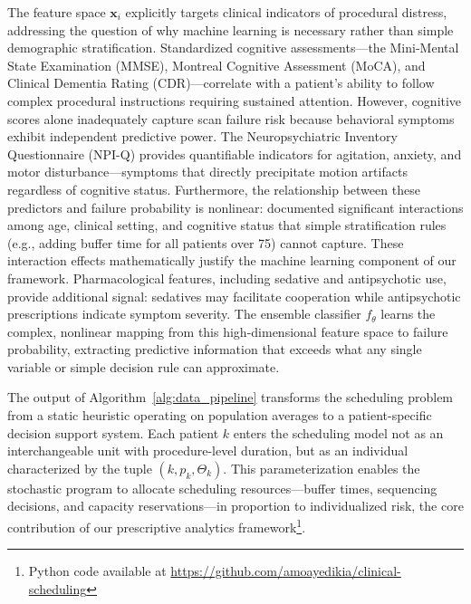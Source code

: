 \documentclass[11pt,a4paper]{article}
\begin{document}
The feature space $\mathbf{x}_i$ explicitly targets clinical indicators of procedural distress, addressing the question of why machine learning is necessary rather than simple demographic stratification. Standardized cognitive assessments---the Mini-Mental State Examination (MMSE), Montreal Cognitive Assessment (MoCA), and Clinical Dementia Rating (CDR)---correlate with a patient's ability to follow complex procedural instructions requiring sustained attention. However, cognitive scores alone inadequately capture scan failure risk because behavioral symptoms exhibit independent predictive power. The Neuropsychiatric Inventory Questionnaire (NPI-Q) provides quantifiable indicators for agitation, anxiety, and motor disturbance---symptoms that directly precipitate motion artifacts regardless of cognitive status. Furthermore, the relationship between these predictors and failure probability is nonlinear: \citet{porembka2025disparities} documented significant interactions among age, clinical setting, and cognitive status that simple stratification rules (e.g., adding buffer time for all patients over 75) cannot capture. These interaction effects mathematically justify the machine learning component of our framework. Pharmacological features, including sedative and antipsychotic use, provide additional signal: sedatives may facilitate cooperation while antipsychotic prescriptions indicate symptom severity. The ensemble classifier $f_{\theta}$ learns the complex, nonlinear mapping from this high-dimensional feature space to failure probability, extracting predictive information that exceeds what any single variable or simple decision rule can approximate.

The output of Algorithm~\ref{alg:data_pipeline} transforms the scheduling problem from a static heuristic operating on population averages to a patient-specific decision support system. Each patient $k$ enters the scheduling model not as an interchangeable unit with procedure-level duration, but as an individual characterized by the tuple $(k, p_k, \Theta_k)$. This parameterization enables the stochastic program to allocate scheduling resources---buffer times, sequencing decisions, and capacity reservations---in proportion to individualized risk, the core contribution of our prescriptive analytics framework\footnote{Python code available at \url{https://github.com/amoayedikia/clinical-scheduling}}.

\end{document}
